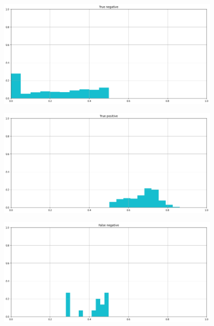 \documentclass[12pt]{report}
\theoremstyle{definition}
\begin{document}
\begin{figure}
\centering
    \begin{minipage}{0.48\textwidth}
     \includegraphics[width=\linewidth]{images/experiment_uniform_disgiunti/tn.png}\label{tn_ud}
   \end{minipage}
   \begin{minipage}{0.48\textwidth}
     \includegraphics[width=\linewidth]{images/experiment_uniform_disgiunti/tp.png}\label{tp_ud}
   \end{minipage}
   \begin{minipage}{0.48\textwidth}
     \includegraphics[width=\linewidth]{images/experiment_uniform_disgiunti/fn.png}\label{fn_ud}
   \end{minipage}

\end{figure}
\end{document}

